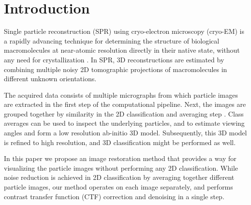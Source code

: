 \documentclass[review]{elsarticle}
\begin{document}
\section{Introduction}
Single particle reconstruction (SPR) using cryo-electron microscopy (cryo-EM) is 
a rapidly advancing technique for determining the structure of biological
macromolecules at near-atomic resolution directly in their native state, without any need for crystallization \cite{cryoem_rev, rev2, nogales, sigworth_rev, kuhlbrandt}. In SPR, 3D reconstructions are estimated by combining multiple noisy 2D tomographic projections
of macromolecules in different unknown orientations.

The acquired data consists of multiple micrographs from which particle images 
are extracted in the first step of the computational pipeline. Next, the images are grouped together
by similarity in the 2D classification and averaging step \cite{jane_classav,park}. Class averages can be used
to inspect the underlying particles, and
to estimate viewing angles and form a low resolution ab-initio 3D model. Subsequently, this 3D model 
is refined to high resolution, and 3D classification might be performed as well. 

In this paper we propose an image restoration method that provides a way for 
visualizing the particle images without performing any 2D classification. 
While noise reduction is achieved in 2D classification by averaging together 
different particle images, our method operates on each image separately, and 
performs contrast transfer function (CTF) correction and denoising in a single 
step. 
\end{document}
